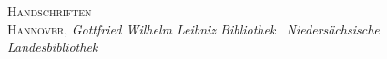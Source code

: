 \noindent
\textsc{Handschriften}\\
\vspace{-3mm}
\noindent
\hspace{15mm}
\textsc{Hannover}, \textit{Gottfried Wilhelm Leibniz Bibliothek \textendash\ Niedersächsische Landesbibliothek}\\
\vspace{-3mm}
\setlength{\columnseprule}{0.4pt}
\renewcommand*{\chapter}{\OrigChapter}
\setlength\LTleft{\fill} \setlength\LTright{\fill}
